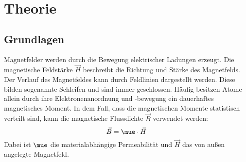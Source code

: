 \section{Theorie}
\label{sec:Theorie}
\subsection{Grundlagen}
Magnetfelder werden durch die Bewegung elektrischer Ladungen erzeugt.
Die magnetische Feldstärke $\vec{H}$ beschreibt die Richtung und Stärke des Magnetfelds.
Der Verlauf des Magnetfeldes kann durch Feldlinien dargestellt werden.
Diese bilden sogenannte Schleifen und sind immer geschlossen.
Häufig besitzen Atome allein durch ihre Elektronenanordnung und -bewegung ein dauerhaftes magnetisches Moment.
In dem Fall, dass die magnetischen Momente statistisch verteilt sind, kann die magnetische Flussdichte $\vec{B}$ verwendet werden:
\begin{equation}
    \vec{B} = \mue \cdot \vec{H}
\end{equation}
Dabei ist $\mue$ die materialabhängige Permeabilität und $\vec{H}$ das von außen angelegte Magnetfeld.  